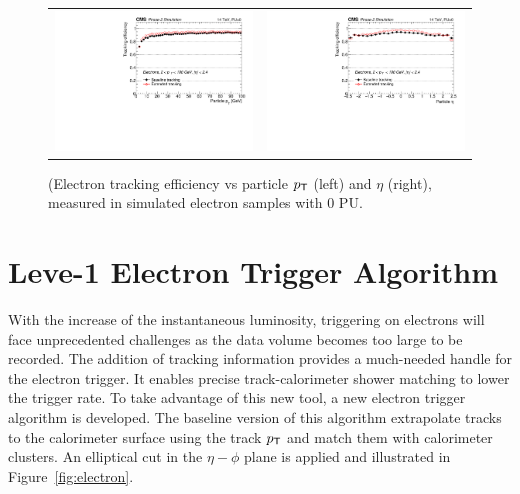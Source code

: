  \begin{figure}[tbh!]
 \begin{center}
  \begin{tabular}{cc}
   \includegraphics[width=.45\linewidth]{figures/Part2/Upgrade/L1TK_elec-pu0_eff_pt}&
   \includegraphics[width=.45\linewidth]{figures/Part2/Upgrade/L1TK_elec-pu0_eff_eta}
  \end{tabular}
  \caption{(Electron tracking efficiency vs particle $p_{\textsf{T}}$ (left) and $\eta$ (right), measured in simulated electron samples with 0 \ac{PU}.}
 \label{fig:electronperformance}
 \end{center}
\end{figure} 

\section{Leve-1 Electron Trigger Algorithm}
\label{sec:L1Ele}

With the increase of the instantaneous luminosity, triggering on electrons will face unprecedented challenges as the data volume becomes too large to be recorded. The addition of tracking information provides a much-needed handle for the electron trigger. It enables precise track-calorimeter shower matching to lower the trigger rate. To take advantage of this new tool, a new electron trigger algorithm is developed. The baseline version of this algorithm extrapolate tracks to the calorimeter surface using the track $p_{\textsf{T}}$ and match them with calorimeter clusters. An elliptical cut in the $\eta-\phi$ plane is applied and illustrated in Figure~\ref{fig:electron}.
  
